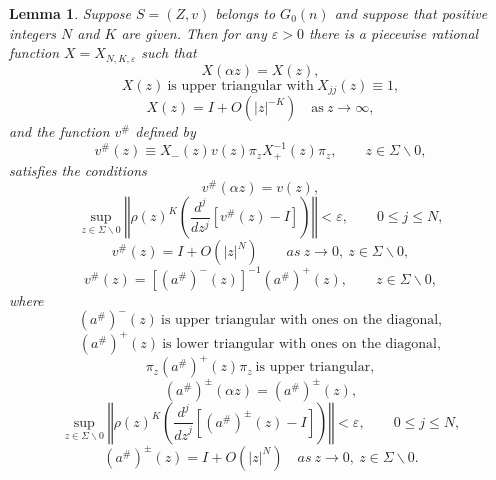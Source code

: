 \documentclass{surv-l}
\theoremstyle{plain}
\newtheorem{lem}[theorem]{\sc Lemma}
\theoremstyle{definition}
\numberwithin{equation}{chapter}
\begin{document}
\begin{lem}\label{lem26.13}
Suppose $S=(Z, v)$ belongs to $G_{0}(n)$ and suppose that positive integers $N$ and $K$ are given. Then for  any $\varepsilon >0$ there is a piecewise rational function $X=X_{N,K,\varepsilon}$ such that
\setcounter{equation}{13}
\begin{equation}\label{eq26.14}
X(\alpha z)=X(z),
\end{equation}
\begin{equation}\label{eq26.15}
X(z)\ \text{is upper triangular with}\ X_{jj}(z)\equiv 1,
\end{equation}
\begin{equation}\label{eq26.16}
X(z)=I+O(|z|^{-K})\quad \mathrm{as}\ z\rightarrow\infty,
\end{equation}
and the function $ v^{\#}$ defined by
\begin{equation}\label{eq26.17}
v^{\#}(z)\equiv X_{-}(z)v(z)\pi_{z}X_{+}^{-1}(z)\pi_{z},\qquad z\in\Sigma\backslash 0,
\end{equation}
satisfies the conditions
\begin{equation}\label{eq26.18}
v^{\#}(\alpha z)=v(z),
\end{equation}
\begin{equation}\label{eq26.19}
\sup_{z\in\Sigma\backslash 0}\left\Vert\rho(z)^{K}\left(\frac{d^{j}}{dz^{j}}[v^{\#}(z)-I]\right)\right\Vert<\varepsilon, \qquad  0\leq j\leq N,
\end{equation}
\begin{equation}\label{eq26.20}
v^{\#}(z)=I+O(|z|^{N})\qquad as\ z\rightarrow 0, \ z\in\Sigma\backslash 0,
\end{equation}
\begin{equation}\label{eq26.21}
v^{\#}(z)=[(a^{\#})^{-}(z)]^{-1}(a^{\#})^{+}(z), \qquad z\in\Sigma\backslash 0,
\end{equation}
where
\begin{equation}\label{eq26.22}
(a^{\#})^{-}(z)\ \text{is upper triangular with ones on the diagonal},
\end{equation}
\begin{equation}\label{eq26.23}
(a^{\#})^{+}(z)\ \text{is lower triangular with ones on the diagonal},
\end{equation}
\begin{equation}\label{eq26.24}
\pi_{z}(a^{\#})^{+}(z)\pi_{z}\ \text{is upper triangular},
\end{equation}
\begin{equation}\label{eq26.25}
(a^{\#})^{\pm}(\alpha z)=(a^{\#})^{\pm}(z),
\end{equation}
\begin{equation}\label{eq26.26}
\sup_{z\in\Sigma\backslash 0}\left\Vert\rho(z)^{K}\left(\frac{d^{j}}{{dz}^{j}}[(a^{\#})^{\pm}(z)-I]\right)\right\Vert<\varepsilon,\qquad 0\leq j\leq N,
\end{equation}
\begin{equation}\label{eq26.27}
(a^{\#})^{\pm}(z)=I+O(|z|^{N})\quad as\ z\rightarrow 0,\ z\in\Sigma\backslash 0.
\end{equation}
\end{lem}
\end{document}
